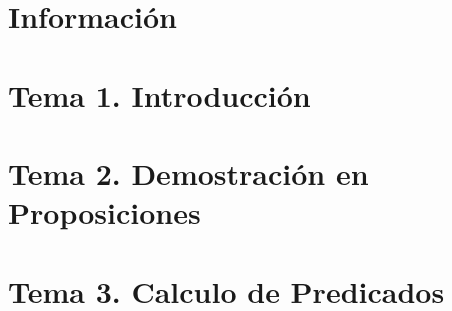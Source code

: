 \documentclass[12pt, twoside, openright]{report} %
\begin{document}







\part{Información}


\part{Tema 1. Introducción}





\part{Tema 2. Demostración  en Proposiciones}








\part{Tema 3. Calculo de Predicados}




\end{document}
